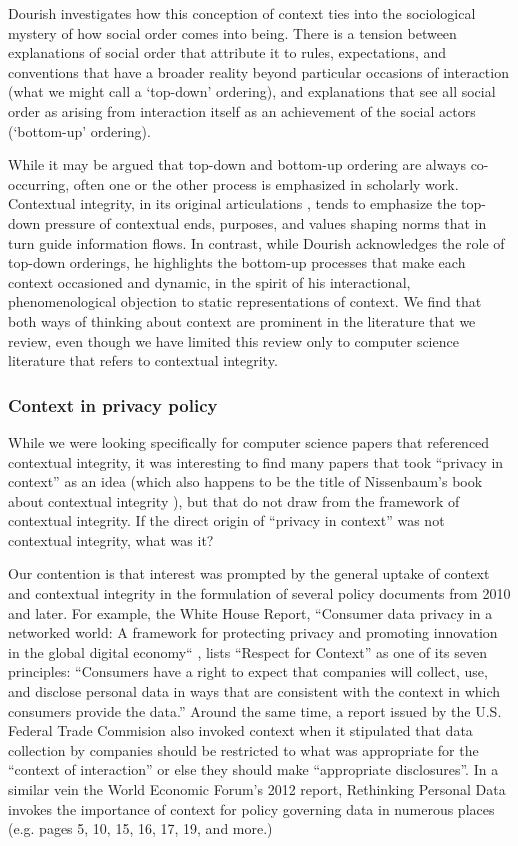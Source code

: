 \documentclass[../thesis.tex]{subfiles}
\begin{document}
Dourish investigates how this conception of context ties into the
sociological mystery of how social order comes into being. There is a
tension between explanations of social order that attribute it to
rules, expectations, and conventions that have a broader reality beyond
particular occasions of interaction (what we might call a
`top-down' ordering), and explanations
that see all social order as arising from interaction itself as an
achievement of the social actors
(`bottom-up' ordering).

While it may be argued that top-down and bottom-up ordering
are always
co-occurring, often one or the other process is emphasized
in scholarly
work. Contextual integrity, in its original articulations
\citep{nissenbaum2004privacy, nissenbaum2009privacy},
tends to emphasize the top-down
pressure of
contextual ends, purposes, and values shaping norms that in turn guide
information flows. In contrast, while Dourish acknowledges the role of
top-down orderings, he highlights the bottom-up processes that make
each context occasioned and dynamic, in the spirit of his
interactional, phenomenological objection to static representations of
context. We find that both ways of thinking about context are prominent
in the literature that we review, even though we have limited this
review only to computer science literature that refers to contextual
integrity. 

\subsubsection{Context in privacy policy}
\label{CI2.2.2}
  
While we were looking specifically for computer science papers that
referenced contextual integrity, it was interesting to find many papers
that took ``privacy in context'' as
an idea (which also happens to be the title of
Nissenbaum's book about contextual integrity
\citep{nissenbaum2009privacy}), but that do not draw from the
framework of contextual integrity.
If the direct origin of ``privacy in
context'' was not contextual integrity, what was it?

Our contention is that interest was prompted by the general uptake of
context and contextual integrity in the formulation of several policy
documents from 2010 and later. For example, the White House Report,
``Consumer data privacy in a networked world: A
framework for protecting privacy and promoting innovation in the global
digital economy`` \citep{house2012consumer}, lists
``Respect for Context'' as one of
its seven principles: ``Consumers have a right to
expect that companies will collect, use, and disclose personal data in
ways that are consistent with the context in which consumers provide
the data.'' Around the same time, a report issued by
the U.S. Federal Trade Commision also invoked context when it
stipulated that data collection by companies should be restricted to
what was appropriate for the ``context of
interaction'' or else they should make
``appropriate disclosures''. In a
similar vein the World Economic Forum's 2012 report,
Rethinking Personal Data invokes the importance of context for policy
governing data in numerous places (e.g. pages 5, 10, 15, 16, 17, 19,
and more.) \citep{wef2012rethinking} 
\end{document}
